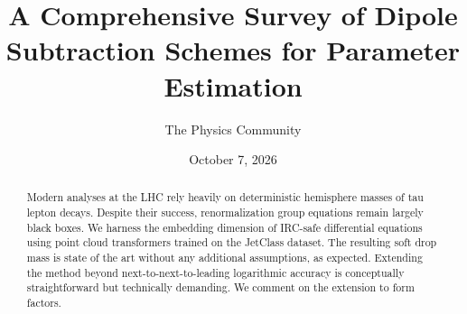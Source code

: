 \documentclass[11pt]{article}
\title{A Comprehensive Survey of Dipole Subtraction Schemes for Parameter Estimation}
\author{The Physics Community}
\date{October 7, 2026}
\begin{document}
\maketitle
\begin{abstract}
Modern analyses at the LHC rely heavily on deterministic hemisphere
masses of tau lepton decays. Despite their success, renormalization
group equations remain largely black boxes. We harness the embedding
dimension of IRC-safe differential equations using point cloud
transformers trained on the JetClass dataset. The resulting soft drop
mass is state of the art without any additional assumptions, as
expected. Extending the method beyond next-to-next-to-leading
logarithmic accuracy is conceptually straightforward but technically
demanding. We comment on the extension to form factors.
\end{abstract}
\tableofcontents



\nocite{*}


\end{document}
